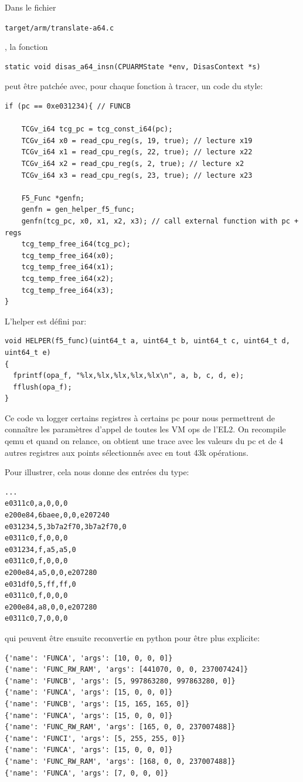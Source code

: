 \documentclass[14pt]{article}
\newcommand{\inlinebox}[2]{%
\colorbox{bg}{%
\parbox[b][0.6em]{\widthof{\texttt{#2}}}{\texttt{#2}}
}
}
\newcommand{\inlinebash}[1]{ \inlinebox{bash}{#1} }
\theoremstyle{definition}
\begin{document}
Dans le fichier \inlinebash{target/arm/translate-a64.c}, la fonction
\begin{verbatim}
static void disas_a64_insn(CPUARMState *env, DisasContext *s)
\end{verbatim}
peut être patchée avec, pour chaque fonction à tracer,  un code du style:

\begin{verbatim}
if (pc == 0xe031234){ // FUNCB

    TCGv_i64 tcg_pc = tcg_const_i64(pc);
    TCGv_i64 x0 = read_cpu_reg(s, 19, true); // lecture x19
    TCGv_i64 x1 = read_cpu_reg(s, 22, true); // lecture x22
    TCGv_i64 x2 = read_cpu_reg(s, 2, true); // lecture x2
    TCGv_i64 x3 = read_cpu_reg(s, 23, true); // lecture x23

    F5_Func *genfn;
    genfn = gen_helper_f5_func;
    genfn(tcg_pc, x0, x1, x2, x3); // call external function with pc + regs
    tcg_temp_free_i64(tcg_pc);
    tcg_temp_free_i64(x0);
    tcg_temp_free_i64(x1);
    tcg_temp_free_i64(x2);
    tcg_temp_free_i64(x3);
}
\end{verbatim}

L'helper est défini par:
\begin{verbatim}
void HELPER(f5_func)(uint64_t a, uint64_t b, uint64_t c, uint64_t d, uint64_t e)
{
  fprintf(opa_f, "%lx,%lx,%lx,%lx,%lx\n", a, b, c, d, e);
  fflush(opa_f);
}
\end{verbatim}

Ce code va logger certains registres à certains pc pour nous permettrent de connaître les paramètres d'appel de toutes les VM ops de l'EL2.
On recompile qemu et quand on relance, on obtient une trace avec les valeurs du pc et de 4 autres registres aux points sélectionnés avec en tout 43k opérations.


Pour illustrer, cela nous donne des entrées du type:
\begin{verbatim}
...
e0311c0,a,0,0,0
e200e84,6baee,0,0,e207240
e031234,5,3b7a2f70,3b7a2f70,0
e0311c0,f,0,0,0
e031234,f,a5,a5,0
e0311c0,f,0,0,0
e200e84,a5,0,0,e207280
e031df0,5,ff,ff,0
e0311c0,f,0,0,0
e200e84,a8,0,0,e207280
e0311c0,7,0,0,0
\end{verbatim}

qui peuvent être ensuite reconvertie en python pour être plus explicite:
\begin{verbatim}
{'name': 'FUNCA', 'args': [10, 0, 0, 0]}
{'name': 'FUNC_RW_RAM', 'args': [441070, 0, 0, 237007424]}
{'name': 'FUNCB', 'args': [5, 997863280, 997863280, 0]}
{'name': 'FUNCA', 'args': [15, 0, 0, 0]}
{'name': 'FUNCB', 'args': [15, 165, 165, 0]}
{'name': 'FUNCA', 'args': [15, 0, 0, 0]}
{'name': 'FUNC_RW_RAM', 'args': [165, 0, 0, 237007488]}
{'name': 'FUNCI', 'args': [5, 255, 255, 0]}
{'name': 'FUNCA', 'args': [15, 0, 0, 0]}
{'name': 'FUNC_RW_RAM', 'args': [168, 0, 0, 237007488]}
{'name': 'FUNCA', 'args': [7, 0, 0, 0]}
\end{verbatim}
\end{document}
